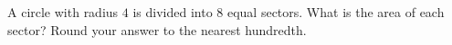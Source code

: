 A circle with radius $4$ is divided into $8$ equal sectors. What is the area of each sector? Round your answer to the nearest hundredth.
